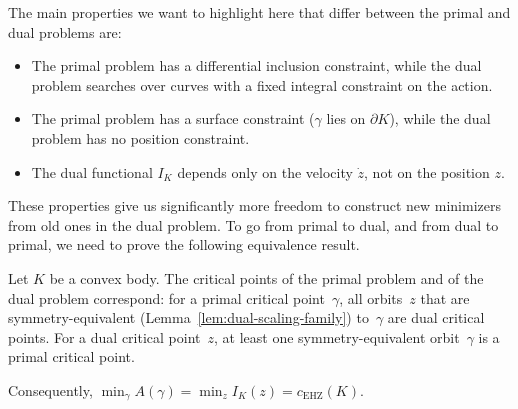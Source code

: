 The main properties we want to highlight here that differ between the primal and dual problems are:
\begin{itemize}
\item The primal problem has a differential inclusion constraint, while the dual problem searches over curves with a fixed integral constraint on the action.
\item The primal problem has a surface constraint ($\gamma$ lies on $\partial K$), while the dual problem has no position constraint.
\item The dual functional $I_K$ depends only on the velocity $\dot{z}$, not on the position $z$.
\end{itemize}
These properties give us significantly more freedom to construct new minimizers from old ones in the dual problem.
To go from primal to dual, and from dual to primal, we need to prove the following equivalence result.

\begin{theorem}%
\label{thm:primal-dual-equivalence}
Let $K$ be a convex body. The critical points of the primal problem and of the
dual problem correspond: for a primal critical point~$\gamma$, all orbits~$z$
that are symmetry-equivalent (Lemma~\ref{lem:dual-scaling-family}) to~$\gamma$
are dual critical points. For a dual critical point~$z$, at least one
symmetry-equivalent orbit~$\gamma$ is a primal critical point.

Consequently, $\min_\gamma A(\gamma) = \min_z I_K(z) = c_{\mathrm{EHZ}}(K)$.
\end{theorem}

